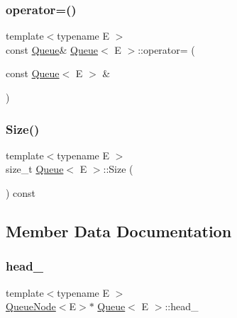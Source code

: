 \mbox{\label{classQueue_adf6f3eb046365f1b67b6c0bd5da2da59}} 
\subsubsection{\texorpdfstring{operator=()}{operator=()}}
{\footnotesize\ttfamily template$<$typename E $>$ \\
const \hyperlink{classQueue}{Queue}\& \hyperlink{classQueue}{Queue}$<$ E $>$\+::operator= (\begin{DoxyParamCaption}\item[{const \hyperlink{classQueue}{Queue}$<$ E $>$ \&}]{ }\end{DoxyParamCaption})\hspace{0.3cm}{\ttfamily [private]}}

\mbox{\label{classQueue_abc4d78b5f66041011c5590bf703847b0}} 
\subsubsection{\texorpdfstring{Size()}{Size()}}
{\footnotesize\ttfamily template$<$typename E $>$ \\
size\+\_\+t \hyperlink{classQueue}{Queue}$<$ E $>$\+::Size (\begin{DoxyParamCaption}{ }\end{DoxyParamCaption}) const\hspace{0.3cm}{\ttfamily [inline]}}



\subsection{Member Data Documentation}
\mbox{\label{classQueue_abf9219bcea800d26e8bfdb4777d98729}} 
\subsubsection{\texorpdfstring{head\+\_\+}{head\_}}
{\footnotesize\ttfamily template$<$typename E $>$ \\
\hyperlink{classQueueNode}{Queue\+Node}$<$E$>$$\ast$ \hyperlink{classQueue}{Queue}$<$ E $>$\+::head\+\_\+\hspace{0.3cm}{\ttfamily [private]}}


